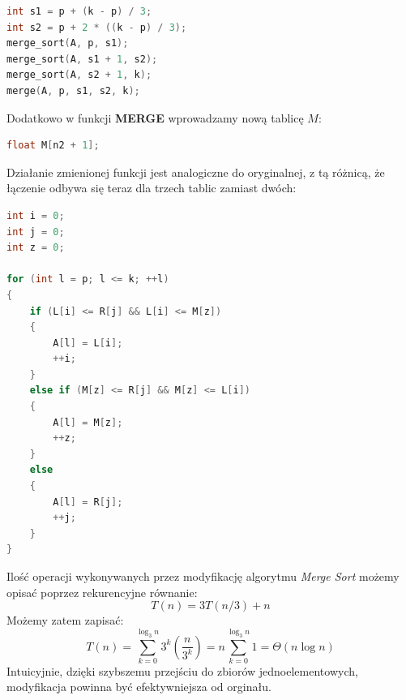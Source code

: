 \documentclass{article}
\begin{document}
\begin{lstlisting}[style=mystyle, language=C++, caption={Fragment implementacji modyfikacji \texttt{Merge Sort}}, label={lst:mergesort2}]
int s1 = p + (k - p) / 3;
int s2 = p + 2 * ((k - p) / 3);
merge_sort(A, p, s1);
merge_sort(A, s1 + 1, s2);
merge_sort(A, s2 + 1, k);
merge(A, p, s1, s2, k);
\end{lstlisting}

Dodatkowo w funkcji \textbf{MERGE} wprowadzamy nową tablicę $M$:
\begin{lstlisting}[style=mystyle, language=C++, caption={Fragment implementacji modyfikacji \texttt{Merge}}, label={lst:merge2}]
float M[n2 + 1];
\end{lstlisting}

Działanie zmienionej funkcji jest analogiczne do oryginalnej, z tą różnicą, że łączenie odbywa się teraz dla trzech tablic zamiast dwóch:
\begin{lstlisting}[style=mystyle, language=C++, caption={Fragment implementacji modyfikacji \texttt{Merge}}, label={lst:merge2l}]
int i = 0;
int j = 0;
int z = 0;

for (int l = p; l <= k; ++l)
{
    if (L[i] <= R[j] && L[i] <= M[z])
    {
        A[l] = L[i];
        ++i;
    }
    else if (M[z] <= R[j] && M[z] <= L[i])
    {
        A[l] = M[z];
        ++z;
    }
    else
    {
        A[l] = R[j];
        ++j;
    }
}
\end{lstlisting}
Ilość operacji wykonywanych przez modyfikację algorytmu \textit{Merge Sort} możemy opisać poprzez rekurencyjne równanie:
\[
    T(n) = 3T(n/3) + n
\]
Możemy zatem zapisać:
\[
    T(n) = \sum_{k=0}^{\log_3 n} 3^k\left(\frac{n}{3^k}\right) = n\sum_{k=0}^{\log_3 n} 1 = \Theta(n \log n)
\]
Intuicyjnie, dzięki szybszemu przejściu do zbiorów jednoelementowych, modyfikacja powinna być efektywniejsza od orginału.
\end{document}
